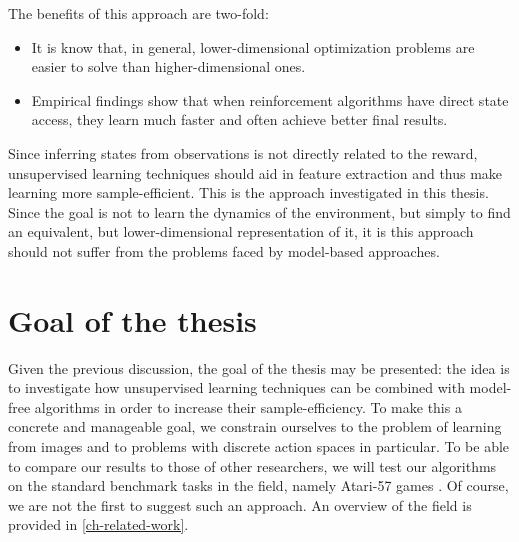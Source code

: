 The benefits of this approach are two-fold:
 \begin{itemize}
    \item It is know that, in general, lower-dimensional optimization 
			problems are easier to solve than higher-dimensional ones.
    \item Empirical findings show that when reinforcement algorithms have direct state access, 
			they learn much faster and often achieve better final results.
\end{itemize}
Since inferring states from observations is not directly related to the reward,
unsupervised learning techniques should aid in 
feature extraction and thus make learning more sample-efficient.
This is the approach investigated in this thesis.
Since the goal is not to learn the dynamics of the environment,
but simply to find an equivalent, but lower-dimensional representation of it,
it is this approach should not suffer from the problems faced
by model-based approaches.


\section{Goal of the thesis}
\label{sec-thesis-goal}
Given the previous discussion, the goal of the thesis may be presented:
the idea is to investigate how unsupervised learning techniques can be combined
with model-free algorithms in order to increase their sample-efficiency.
To make this a concrete and manageable goal,
we constrain ourselves to the problem of learning from images and to problems
with discrete action spaces in particular.
To be able to compare our results to those of other researchers,
we will test our algorithms on the standard benchmark tasks in the field,
namely Atari-57 games \cite{bellemare2013arcade}.
Of course, we are not the first to suggest such an approach.
An overview of the field is provided in \ref{ch-related-work}.

